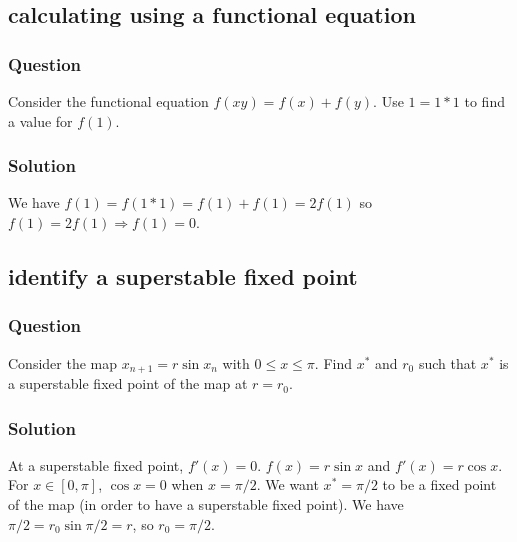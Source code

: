 \documentclass[12pt,letterpaper,noanswers]{exam}
\begin{document}
\subsection{calculating using a functional equation}
\subsubsection{Question}
Consider the functional equation $f(xy) = f(x) + f(y)$.  Use $1 = 1*1$ to find a value for $f(1)$.

\subsubsection{Solution}
We have $f(1) = f(1*1) = f(1)+f(1) = 2f(1)$ so $f(1) = 2f(1) \Rightarrow f(1) = 0$.

\subsection{identify a superstable fixed point}
\subsubsection{Question}
Consider the map $x_{n+1} = r\sin x_n$ with $0\leq x \leq \pi$.  Find $x^*$ and $r_0$ such that $x^*$ is a superstable fixed point of the map at $r = r_0$.

\subsubsection{Solution}
At a superstable fixed point, $f'(x) = 0$.  $f(x) = r\sin x$ and $f'(x) = r\cos x$.  For $x \in [0,\pi]$, $\cos x = 0$ when $x = \pi/2$.  We want $x^* = \pi/2$ to be a fixed point of the map (in order to have a superstable fixed point).  We have $\pi/2 = r_0\sin\pi/2 = r$, so $r_0 = \pi/2$.  
\end{document}
